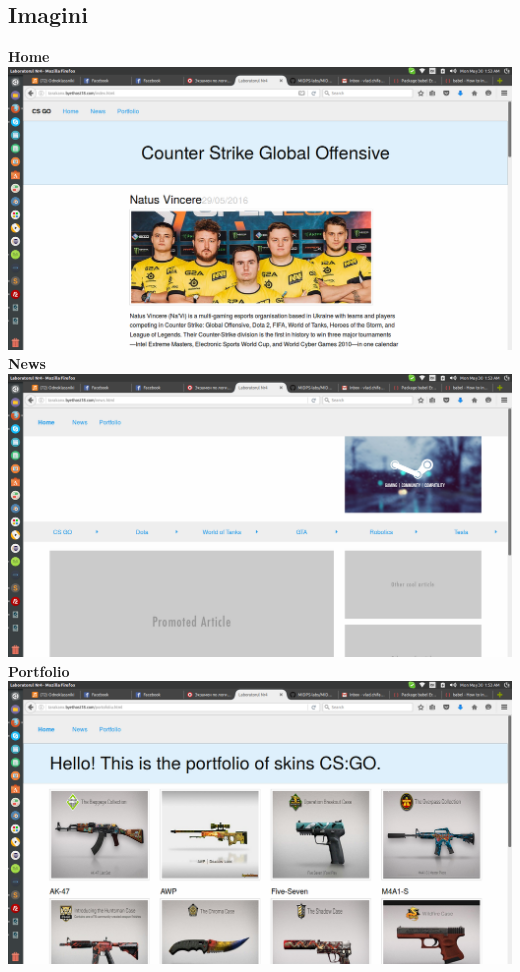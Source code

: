 \subsection{Imagini}
\textbf{Home}\\
\includegraphics[scale=0.3]{imagini/Home.png} \\
\newpage
\textbf{News}\\
\includegraphics[scale=0.3]{imagini/news.png} \\
\textbf{Portfolio}\\
\includegraphics[scale=0.3]{imagini/slide.png} 


\clearpage